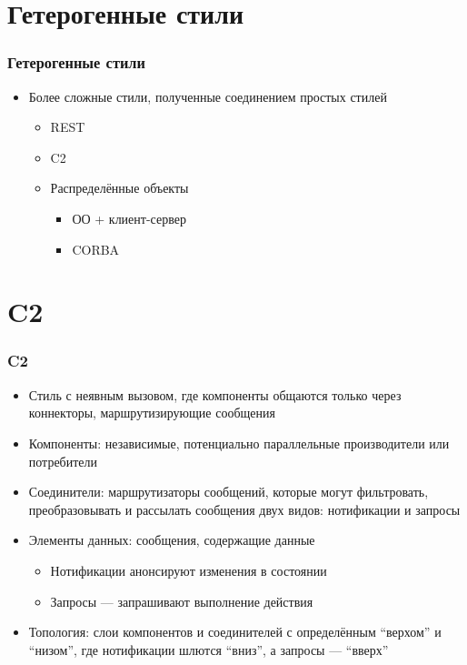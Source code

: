 \documentclass[xetex,mathserif,serif]{beamer}
\begin{document}
    \section{Гетерогенные стили}

    \begin{frame}
        \frametitle{Гетерогенные стили}
        \begin{itemize}
            \item Более сложные стили, полученные соединением простых стилей
            \begin{itemize}
                \item REST
                \item C2
                \item Распределённые объекты
                \begin{itemize}
                    \item ОО + клиент-сервер
                    \item CORBA
                \end{itemize}
            \end{itemize}
        \end{itemize}
    \end{frame}

    \section{C2}

    \begin{frame}
        \frametitle{C2}
        \begin{itemize}
            \item Стиль с неявным вызовом, где компоненты общаются только через коннекторы, маршрутизирующие сообщения
            \item Компоненты: независимые, потенциально параллельные производители или потребители
            \item Соединители: маршрутизаторы сообщений, которые могут фильтровать, преобразовывать и рассылать сообщения двух видов: нотификации и запросы
            \item Элементы данных: сообщения, содержащие данные
            \begin{itemize}
                \item Нотификации анонсируют изменения в состоянии
                \item Запросы --- запрашивают выполнение действия
            \end{itemize}
            \item Топология: слои компонентов и соединителей с определённым ``верхом'' и ``низом'', где нотификации шлются ``вниз'', а запросы --- ``вверх''
        \end{itemize}
    \end{frame}
\end{document}
